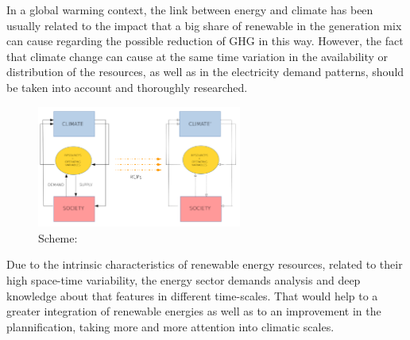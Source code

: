 In a global warming context, the link between energy and climate has been usually related to the impact that a big share of renewable in the generation mix can cause regarding the possible reduction of GHG in this way. However, the fact that climate change can cause at the same time variation in the availability or distribution of the resources, as well as in the electricity demand patterns, should be taken into account and thoroughly researched. 

\begin{figure}[h!]
\centering\includegraphics[width=0.6\textwidth]{figs/esquema.pdf}
\caption{Scheme: }
\label{fig:feedback}
\end{figure}


Due to the intrinsic characteristics of renewable energy resources, related to their high space-time variability, the energy sector demands analysis and deep knowledge about that features in different time-scales. That would help to a greater integration of renewable energies as well as to an improvement in the plannification, taking more and more attention into climatic scales.


